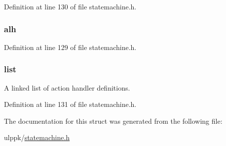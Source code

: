Definition at line 130 of file statemachine.\-h.

\hypertarget{struct__action__list_ae71cc2f57d6453e22c531e08d61af27b}{
\subsubsection[{alh}]{ alh}}\label{struct__action__list_ae71cc2f57d6453e22c531e08d61af27b}


Definition at line 129 of file statemachine.\-h.

\hypertarget{struct__action__list_a973f3feaadef504857bd689dae19ebeb}{
\subsubsection[{list}]{ list}}\label{struct__action__list_a973f3feaadef504857bd689dae19ebeb}


A linked list of action handler definitions. 



Definition at line 131 of file statemachine.\-h.



The documentation for this struct was generated from the following file\-:\begin{DoxyCompactItemize}
\item 
ulppk/\hyperlink{statemachine_8h}{statemachine.\-h}\end{DoxyCompactItemize}

